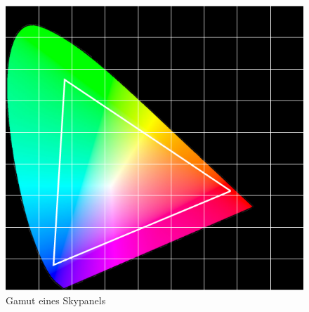 \documentclass[11pt]{scrartcl}
\begin{document}
\begin{figure}[H]
    \begin{center}
        \includegraphics[width=.9\textwidth]{images/gamut_skypanel.png} %
    \end{center}
    \caption{Gamut eines Skypanels} \label{fig:gamutSkypanel}
\end{figure}
\noindent
\end{document}
